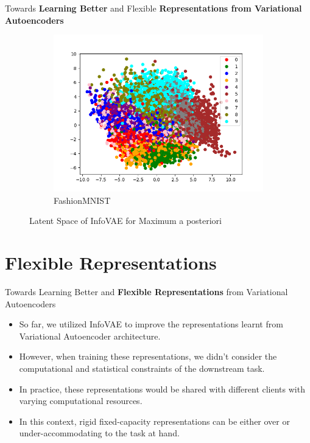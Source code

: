 \documentclass[hyperref={colorlinks,citecolor=blue,linkcolor=blue,urlcolor=blue}]{beamer}
\begin{document}
\begin{frame}{ Towards \textbf{Learning Better} and Flexible \textbf{Representations from Variational Autoencoders} \vspace{0.3em}}
\begin{figure}
\begin{subfigure}[b]{0.4\textwidth}
        \includegraphics[width=\textwidth]{./Images/latent_FashionMNIST_MMD_MAP.png}
        \caption{FashionMNIST}
    \end{subfigure}
    \caption{Latent Space of InfoVAE for Maximum a posteriori}
  \end{figure}
\end{frame}

\section{Flexible Representations}

\begin{frame}{ Towards Learning Better and \textbf{Flexible Representations} from Variational Autoencoders \vspace{0.3em}}
  \begin{itemize}
    \item So far, we utilized InfoVAE to improve the representations learnt from Variational Autoencoder architecture.
    \item However, when training these representations, we didn't consider the computational and statistical constraints of the downstream task.
    \item In practice, these representations would be shared with different clients with varying computational resources. 
    \item In this context, rigid fixed-capacity representations can be either over or under-accommodating to the task at hand.
  \end{itemize}
\end{frame}
\end{document}
